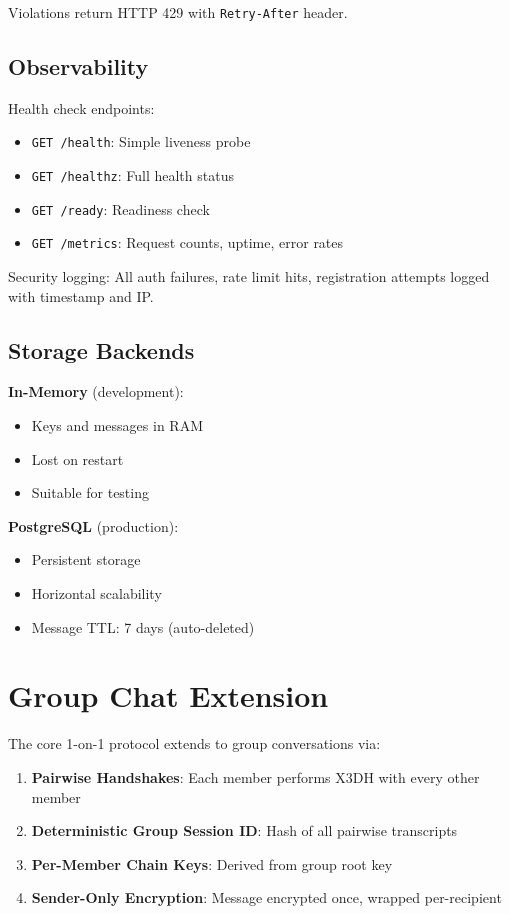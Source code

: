 \documentclass[11pt,a4paper,oneside]{article}
\begin{document}
Violations return HTTP 429 with \texttt{Retry-After} header.

\subsection{Observability}

Health check endpoints:
\begin{itemize}
\item \texttt{GET /health}: Simple liveness probe
\item \texttt{GET /healthz}: Full health status
\item \texttt{GET /ready}: Readiness check
\item \texttt{GET /metrics}: Request counts, uptime, error rates
\end{itemize}

Security logging: All auth failures, rate limit hits, registration attempts logged with timestamp and IP.

\subsection{Storage Backends}

\textbf{In-Memory} (development):
\begin{itemize}
\item Keys and messages in RAM
\item Lost on restart
\item Suitable for testing
\end{itemize}

\textbf{PostgreSQL} (production):
\begin{itemize}
\item Persistent storage
\item Horizontal scalability
\item Message TTL: 7 days (auto-deleted)
\end{itemize}

\section{Group Chat Extension}

The core 1-on-1 protocol extends to group conversations via:

\begin{enumerate}
\item \textbf{Pairwise Handshakes}: Each member performs X3DH with every other member
\item \textbf{Deterministic Group Session ID}: Hash of all pairwise transcripts
\item \textbf{Per-Member Chain Keys}: Derived from group root key
\item \textbf{Sender-Only Encryption}: Message encrypted once, wrapped per-recipient
\end{enumerate}
\end{document}
